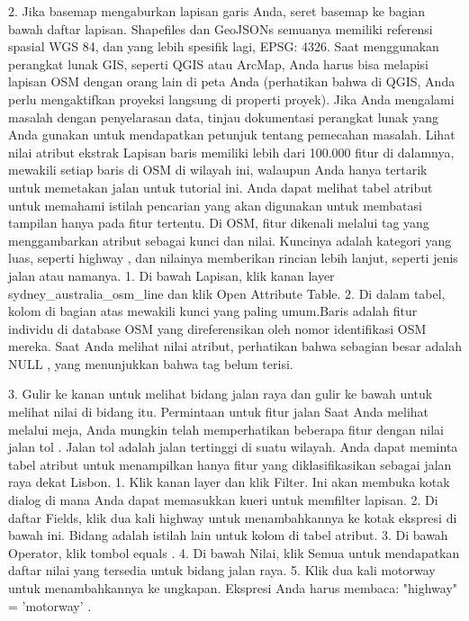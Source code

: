 \begin{enumerate}
2.	Jika basemap mengaburkan lapisan garis Anda, seret basemap ke bagian bawah daftar lapisan.
Shapefiles dan GeoJSONs semuanya memiliki referensi spasial WGS 84, dan yang lebih spesifik lagi, EPSG: 4326. Saat menggunakan perangkat lunak GIS, seperti QGIS atau ArcMap, Anda harus bisa melapisi lapisan OSM dengan orang lain di peta Anda (perhatikan bahwa di QGIS, Anda perlu mengaktifkan proyeksi langsung di properti proyek). Jika Anda mengalami masalah dengan penyelarasan data, tinjau dokumentasi perangkat lunak yang Anda gunakan untuk mendapatkan petunjuk tentang pemecahan masalah.
Lihat nilai atribut ekstrak
Lapisan baris memiliki lebih dari 100.000 fitur di dalamnya, mewakili setiap baris di OSM di wilayah ini, walaupun Anda hanya tertarik untuk memetakan jalan untuk tutorial ini. Anda dapat melihat tabel atribut untuk memahami istilah pencarian yang akan digunakan untuk membatasi tampilan hanya pada fitur tertentu.
Di OSM, fitur dikenali melalui tag yang menggambarkan atribut sebagai kunci dan nilai. Kuncinya adalah kategori yang luas, seperti highway , dan nilainya memberikan rincian lebih lanjut, seperti jenis jalan atau namanya.
1.	Di bawah Lapisan, klik kanan layer sydney_australia_osm_line dan klik Open Attribute Table.
2.	Di dalam tabel, kolom di bagian atas mewakili kunci yang paling umum.Baris adalah fitur individu di database OSM yang direferensikan oleh nomor identifikasi OSM mereka. Saat Anda melihat nilai atribut, perhatikan bahwa sebagian besar adalah NULL , yang menunjukkan bahwa tag belum terisi.
 
3.	Gulir ke kanan untuk melihat bidang jalan raya dan gulir ke bawah untuk melihat nilai di bidang itu.
Permintaan untuk fitur jalan
Saat Anda melihat melalui meja, Anda mungkin telah memperhatikan beberapa fitur dengan nilai jalan tol . Jalan tol adalah jalan tertinggi di suatu wilayah. Anda dapat meminta tabel atribut untuk menampilkan hanya fitur yang diklasifikasikan sebagai jalan raya dekat Lisbon.
1.	Klik kanan layer dan klik Filter. Ini akan membuka kotak dialog di mana Anda dapat memasukkan kueri untuk memfilter lapisan.
2.	Di daftar Fields, klik dua kali highway untuk menambahkannya ke kotak ekspresi di bawah ini. Bidang adalah istilah lain untuk kolom di tabel atribut.
3.	Di bawah Operator, klik tombol equals .
4.	Di bawah Nilai, klik Semua untuk mendapatkan daftar nilai yang tersedia untuk bidang jalan raya.
5.	Klik dua kali motorway untuk menambahkannya ke ungkapan. Ekspresi Anda harus membaca: "highway" = 'motorway' .
 

\end{enumerate}
